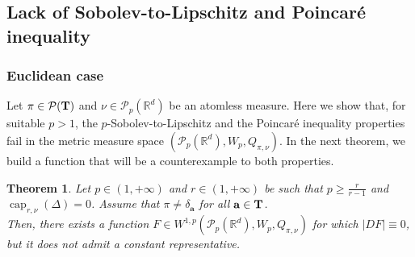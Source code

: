 \documentclass[10pt,leqno]{amsart}
\numberwithin{equation}{section}
\newtheorem{teorema}{Theorem}[section]
\newcommand{\R}{\mathbb{R}}
\newcommand{\Q}{\mathbb{Q}}
\newcommand{\PP}{\mathcal{P}}
\renewcommand{\Q}{Q}
\begin{document}
\subsection{Lack of Sobolev-to-Lipschitz and Poincar\'e inequality}\label{subsec: sob to lip poincare}

\subsubsection{Euclidean case}
Let $\pi \in \PP(\bold{T})$ and $\nu\in \PP_p(\R^d)$ be an atomless measure. Here we show that, for suitable $p>1$, the $p$-Sobolev-to-Lipschitz and the Poincaré inequality properties fail in the metric measure space $(\PP_p(\R^d),W_p,\Q_{\pi,\nu})$. In the next theorem, we build a function that will be a counterexample to both properties.

\begin{teorema}\label{thm: euclidean case}
    Let $p\in(1,+\infty)$ and $r\in(1,+\infty)$ be such that $p\geq \frac{r}{r-1}$ and $\operatorname{cap}_{r,\nu}(\Delta) = 0$. Assume that $\pi \neq \delta_{\mathbf{a}}$ for all $\mathbf{a}\in \bold{T}$. 
    \\
    Then, there exists a function $F \in W^{1,p}(\PP_p(\R^d),W_p,Q_{\pi,\nu})$ for which $|DF| \equiv 0$, but it does not admit a constant representative.
\end{teorema}
\end{document}
